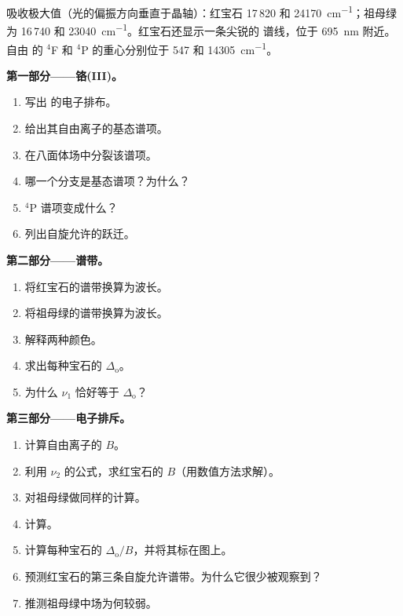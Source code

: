 \begin{problem}
\label{pb:b3:complex-spectra-magnetism:1}
吸收极大值（光的偏振方向垂直于晶轴）：红宝石
17\,820 和 \qty{24170}{cm^{-1}}；祖母绿为 16\,740 和 \qty{23040}{cm^{-1}}。红宝石还显示一条尖锐的
谱线，位于 \qty{695}{nm} 附近。自由  的 $^4$F 和 $^4$P 的重心分别位于 547 和 \qty{14305}{cm^{-1}}。

\medskip\noindent\textbf{第一部分——铬(III)。}
\begin{enumerate}
  \item 写出  的电子排布。
  \item 给出其自由离子的基态谱项。
  \item 在八面体场中分裂该谱项。
  \item 哪一个分支是基态谱项？为什么？
  \item $^4$P 谱项变成什么？
  \item 列出自旋允许的跃迁。
\end{enumerate}

\medskip\noindent\textbf{第二部分——谱带。}
\begin{enumerate}[resume]
  \item 将红宝石的谱带换算为波长。
  \item 将祖母绿的谱带换算为波长。
  \item 解释两种颜色。
  \item 求出每种宝石的 $\Delta_{\mathrm o}$。
  \item 为什么 $\nu_1$ 恰好等于 $\Delta_{\mathrm o}$？
\end{enumerate}

\medskip\noindent\textbf{第三部分——电子排斥。}
\begin{enumerate}[resume]
  \item 计算自由离子的 $B$。
  \item 利用 $\nu_2$ 的公式，求红宝石的 $B$（用数值方法求解）。
  \item 对祖母绿做同样的计算。
  \item 计算。
  \item 计算每种宝石的 $\Delta_{\mathrm o}/B$，并将其标在图上。
  \item 预测红宝石的第三条自旋允许谱带。为什么它很少被观察到？
  \item 推测祖母绿中场为何较弱。
\end{enumerate}


\end{problem}
